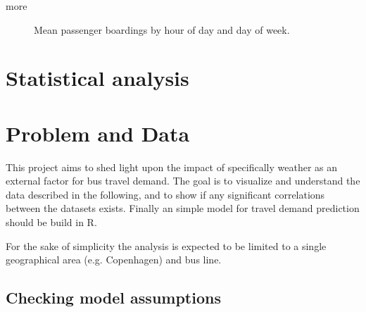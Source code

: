 \documentclass[a4paper,11pt]{article}
\begin{document}
more

\begin{figure}[!ht]
	\center
	
	\caption{Mean passenger boardings by hour of day and day of week.}
\end{figure}

\section{Statistical analysis}

\section{Problem and Data}\label{ch:data_old}
This project aims to shed light upon the impact of specifically weather as an external factor for bus travel demand. The goal is to visualize and understand the data described in the following, and to show if any significant correlations between the datasets exists. Finally an simple model for travel demand prediction should be build in R.

For the sake of simplicity the analysis is expected to be limited to a single geographical area (e.g. Copenhagen) and bus line.

\subsection{Checking model assumptions}

\begin{spacing}{1}
  
  
\end{spacing}
\end{document}
